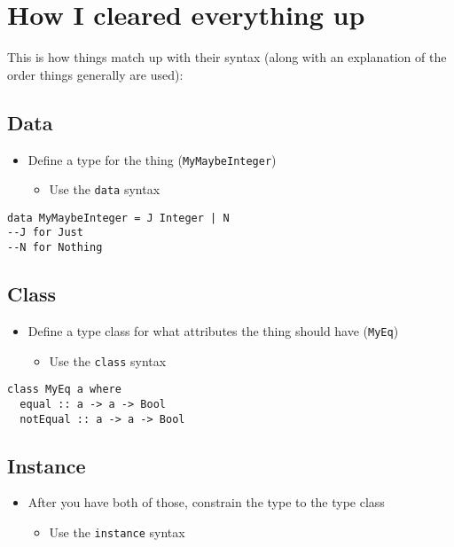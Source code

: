 \documentclass[12pt]{article}
\newcommand{\tightlist}{\setlength{\itemsep}{0pt}\setlength{\parskip}{0pt}}
\begin{document}
\section{How I cleared everything
up}\label{how-i-cleared-everything-up}

This is how things match up with their syntax (along with an explanation
of the order things generally are used):

\subsection{Data}

\begin{itemize}
\tightlist
\item
  Define a type for the thing (\texttt{MyMaybeInteger})
  \begin{itemize}
    \item
      Use the \texttt{data} syntax
  \end{itemize}
\end{itemize}

\begin{verbatim}
data MyMaybeInteger = J Integer | N
--J for Just 
--N for Nothing 
\end{verbatim}

\subsection{Class}

\begin{itemize}
\tightlist
\item
  Define a type class for what attributes the thing should have
  (\texttt{MyEq})
  \begin{itemize}
    \item
      Use the \texttt{class} syntax
  \end{itemize}
\end{itemize}

\begin{verbatim}
class MyEq a where 
  equal :: a -> a -> Bool 
  notEqual :: a -> a -> Bool 
\end{verbatim}

\subsection{Instance}

\begin{itemize}
\tightlist
\item
  After you have both of those, constrain the type to the type class
  \begin{itemize}
    \item
      Use the \texttt{instance} syntax
  \end{itemize}
\end{itemize}
\end{document}
